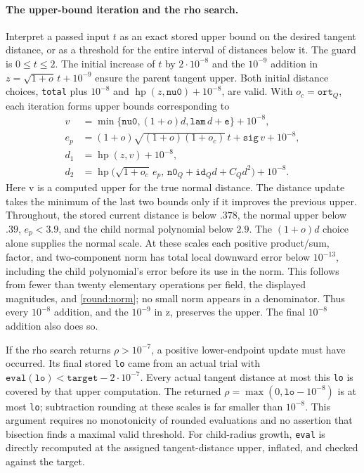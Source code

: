 \paragraph{The upper-bound iteration and the rho search.}
Interpret a passed input $t$ as an exact stored upper bound on the
desired tangent distance, or as a threshold for the entire interval
of distances below it.  The guard is $0\le t\le2$.
The initial increase of $t$ by $2\cdot10^{-8}$ and the
$10^{-9}$ addition in
$z=\sqrt{1+o}\,t+10^{-9}$ ensure the parent tangent upper.
Both initial distance choices, \texttt{total} plus $10^{-8}$ and
$\operatorname{hp}(z,\mathtt{nu0})+10^{-8}$, are valid.
With $o_c=\mathtt{ort}_Q$, each iteration forms upper bounds
corresponding to
\[
 \begin{split}
 v&=
 \min\{\mathtt{nu0},(1+o)d,\mathtt{lam}\,d+\mathtt{e}\}
                     +10^{-8},\\
 e_p&=(1+o)\sqrt{(1+o)(1+o_c)}\,t+\mathtt{sig}\,v+10^{-8},\\
 d_1&=\operatorname{hp}(z,v)+10^{-8},\\
 d_2&=\operatorname{hp}\bigl(\sqrt{1+o_c}\,e_p,\,
              \mathtt{n0}_Q+\mathtt{id}_Qd+C_Qd^2\bigr)+10^{-8}.
 \end{split}
\]
Here v is a computed upper for the true normal distance.
The distance update takes the minimum of the last two bounds only
if it improves the previous upper.
Throughout, the stored current distance is below $.378$,
the normal upper below $.39$, $e_p<3.9$, and the child normal
polynomial below $2.9$.
The $(1+o)d$ choice alone supplies the normal scale.
At these scales each positive product/sum, factor, and
two-component norm has total local downward error below $10^{-13}$,
including the child polynomial's error before its use in the norm.
This follows from fewer than twenty elementary operations per field,
the displayed magnitudes, and \eqref{round:norm}; no small norm
appears in a denominator.  Thus every $10^{-8}$ addition, and the
$10^{-9}$ in z, preserves the upper.  The final $10^{-8}$ addition
also does so.

If the rho search returns $\rho>10^{-7}$, a positive lower-endpoint
update must have occurred.  Its final stored \texttt{lo} came from
an actual trial with
$\mathtt{eval}(\mathtt{lo})<\mathtt{target}-2\cdot10^{-7}$.
Every actual tangent distance at most this \texttt{lo} is covered
by that upper computation.  The returned
$\rho=\max(0,\mathtt{lo}-10^{-8})$ is at most \texttt{lo};
subtraction rounding at these scales is far smaller than $10^{-8}$.
This argument requires no monotonicity of rounded evaluations and
no assertion that bisection finds a maximal valid threshold.
For child-radius growth, \texttt{eval} is directly recomputed at
the assigned tangent-distance upper, inflated, and checked against
the target.

